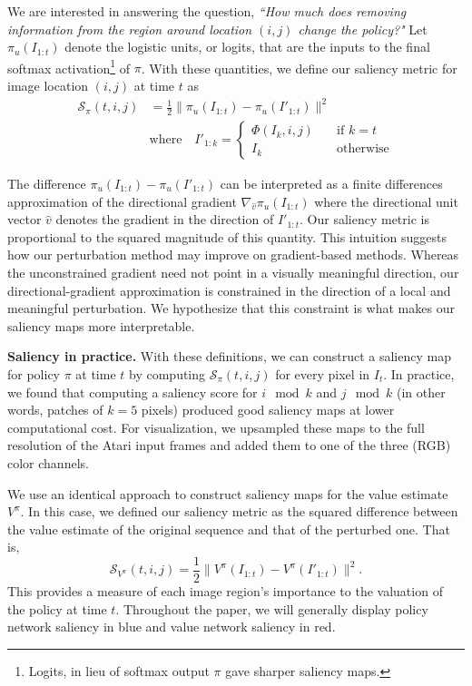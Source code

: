 \documentclass{article}
\begin{document}
We are interested in answering the question, \textit{``How much does removing information from the region around location $(i,j)$ change the policy?"} Let $\pi_u(I_{1:t})$ denote the logistic units, or logits, that are the inputs to the final softmax activation\footnote{Logits, in lieu of softmax output $\pi$ gave sharper saliency maps.} of $\pi$. With these quantities, we define our saliency metric for image location $(i,j)$ at time $t$ as
%
\begin{align}
\mathcal{S}_{\pi}(t,i,j) &= \frac{1}{2} \| \pi_u(I_{1:t}) - \pi_u(I'_{1:t}) \|^2 \\
& \textrm{where} \quad I'_{1:k} = \begin{cases} \Phi(I_k,i,j) \quad & \textrm{if $k=t$} \\ I_k \quad & \textrm{otherwise} \end{cases}
\label{eqn:our-saliency}
\end{align}

The difference $\pi_u(I_{1:t}) - \pi_u(I'_{1:t})$ can be interpreted as a finite differences approximation of the directional gradient $\nabla_{\hat v} \pi_u(I_{1:t})$ where the directional unit vector $\hat v$ denotes the gradient in the direction of $I'_{1:t}$. Our saliency metric is proportional to the squared magnitude of this quantity. This intuition suggests how our perturbation method may improve on gradient-based methods. Whereas the unconstrained gradient need not point in a visually meaningful direction, our directional-gradient approximation is constrained in the direction of a local and meaningful perturbation. We hypothesize that this constraint is what makes our saliency maps more interpretable. 

\textbf{Saliency in practice.} With these definitions, we can construct a saliency map for policy $\pi$ at time $t$ by computing $\mathcal{S}_{\pi}(t,i,j)$ for every pixel in $I_{t}$. In practice, we found that computing a saliency score for $i \mod k$ and $j \mod k$ (in other words, patches of $k=5$ pixels) produced good saliency maps at lower computational cost. For visualization, we upsampled these maps to the full resolution of the Atari input frames and added them to one of the three (RGB) color channels.

We use an identical approach to construct saliency maps for the value estimate $V^{\pi}$. In this case, we defined our saliency metric as the squared difference between the value estimate of the original sequence and that of the perturbed one. That is,
\begin{equation}
\mathcal{S}_{V^{\pi}}(t,i,j) = \frac{1}{2} \| V^{\pi}(I_{1:t}) - V^{\pi}(I'_{1:t}) \|^2.
\end{equation}
This provides a measure of each image region's importance to the valuation of the policy at time $t$. Throughout the paper, we will generally display policy network saliency in blue and value network saliency in red. 
\end{document}
